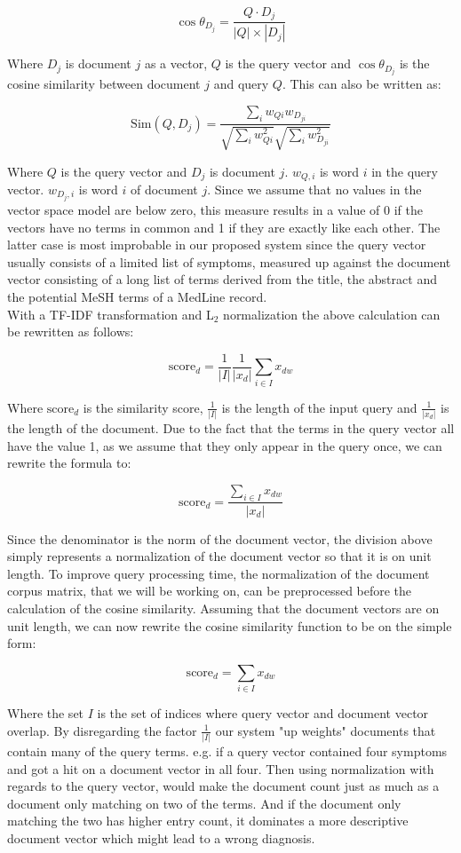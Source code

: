 \[
\cos \theta_{D_j} = \frac{Q \cdot D_j}{|Q| \times |D_j|}
\]

Where $D_j$ is document $j$ as a vector, $Q$ is the query vector and
$\cos \theta_{D_{j}}$ is the cosine similarity between document $j$ and
query $Q$. This can also be written as: 

\[
\textrm{Sim}(Q,D_{j}) = \frac{\sum_{i}w_{Qi} w_{D_{ji}}}{\sqrt{\sum_{i}w_{Qi}^{2}} \sqrt{\sum_{i}w_{D_{ji}}^{2}}}
\]

Where $Q$ is the query vector and $D_j$ is document $j$. $w_{Q,i}$ is
word $i$ in the query vector. $w_{D_{j},i}$ is word $i$ of document
$j$. Since we assume that no values in the vector space model are
below zero, this measure results in a value of 0 if the vectors have
no terms in common and 1 if they are exactly like each other. The
latter case is most improbable in our proposed system since the query
vector usually consists of a limited list of symptoms, measured up
against the document vector consisting of a long list of terms derived
from the title, the abstract and the potential MeSH terms of a MedLine
record. \\

With a TF-IDF transformation and L$_2$ normalization the above
calculation can be rewritten as follows: 

\[
\textrm{score}_{d} = \frac{1}{|I|}\frac{1}{|x_{d}|} \sum_{i \in I} x_{dw}
\]

Where $\textrm{score}_{d}$ is the similarity score, $\frac{1}{|I|}$ is the length
of the input query and $\frac{1}{|x_{d}|}$ is the length of the
document. Due to the fact that the terms in the query vector all have
the value 1, as we assume that they only appear in the query once, we
can rewrite the formula to: 

\[
\textrm{score}_{d} = \frac{\sum_{i \in I} x_{dw}} {|x_{d}|}
\]

Since the denominator is the norm of the document vector, the division
above simply represents a normalization of the document vector so that
it is on unit length. To improve query processing time, the
normalization of the document corpus matrix, that we will be working
on, can be preprocessed before the calculation of the cosine
similarity. Assuming that the document vectors are on unit length, we
can now rewrite the cosine similarity function to be on the simple
form: 

\[
\textrm{score}_{d} =  \sum_{i \in I} x_{dw}
\]

Where the set $I$ is the set of indices where query vector and
document vector overlap. By disregarding the factor $\frac{1}{|I|}$
our system "up weights" documents that contain many of the query
terms. e.g. if a query vector contained four symptoms and got a hit on
a document vector in all four. Then using normalization with regards
to the query vector, would make the document count just as much as a
document only matching on two of the terms. And if the document only
matching the two has higher entry count, it dominates a more
descriptive document vector which might lead to a wrong diagnosis.\\

